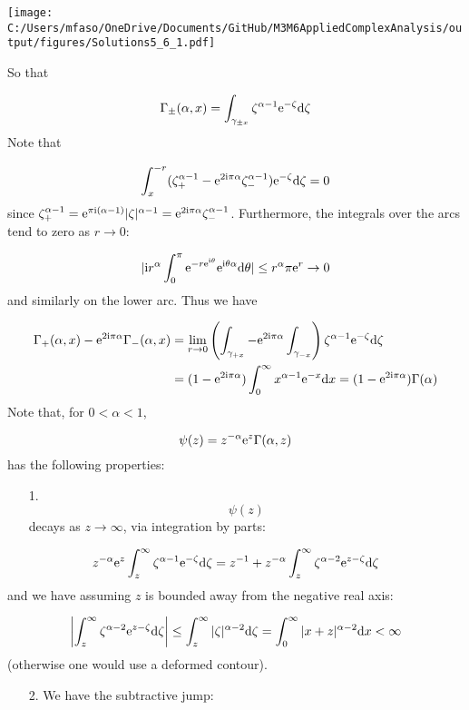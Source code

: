 \documentclass[12pt,landscape]{article}
\def\D{ {\rm d} }
\def\I{ {\rm i} }
\def\E{ {\rm e} }
\def\addtab#1={#1\;&=}
\def\ccr{\\\addtab}
\def\dx{\D x}
\def\addtab#1={#1\;&=}
\def\ccr{\\\addtab}
\begin{document}
{\texttt{[image: C:/Users/mfaso/OneDrive/Documents/GitHub/M3M6AppliedComplexAnalysis/output/figures/Solutions5\_6\_1.pdf]}

So that

\[
\Gamma_\pm(\alpha, x) = \int_{\gamma_{\pm x}} \zeta^{\alpha-1} \E^{-\zeta} \D \zeta
\]
Note that

\[
\int_x^{-r} (\zeta_+^{\alpha - 1} - \E^{2 \I \pi \alpha} \zeta_-^{\alpha -1}) \E^{-\zeta} \D\zeta = 0
\]
since $\zeta_+^{\alpha-1} = \E^{\pi \I (\alpha-1)}|\zeta|^{\alpha-1} = \E^{2 \I \pi \alpha} \zeta_-^{\alpha-1}$. Furthermore, the integrals over the arcs tend to zero as $r \rightarrow 0$:

\[
|\I r^\alpha \int_0^\pi \E^{- r \E^{\I \theta}} \E^{\I \theta \alpha} \D \theta  | \leq r^\alpha \pi \E^r  \rightarrow 0
\]
and similarly on the lower arc. Thus we have


\begin{align*}
\Gamma_+(\alpha, x)-\E^{2 \I \pi \alpha} \Gamma_-(\alpha, x) &= \lim_{r \rightarrow 0 } \left(\int_{\gamma_{+x}} - \E^{2 \I \pi \alpha} \int_{\gamma_{-x}}\right) \zeta^{\alpha-1} \E^{-\zeta} \D \zeta \ccr
 = (1 - \E^{2 \I \pi \alpha})\int_0^\infty x^{\alpha-1} \E^{-x} \dx = (1 - \E^{2 \I \pi \alpha})\Gamma(\alpha)
\end{align*}
Note that, for $0 < \alpha < 1$,

\[
    \psi(z) = z^{-\alpha} \E^z \Gamma(\alpha, z)
\]
has the following properties:

\begin{itemize}
\item[1. ] \[
\psi(z)
\]
decays as $z \rightarrow \infty$, via integration by parts:

\end{itemize}
\[
    z^{-\alpha} \E^z \int_z^\infty \zeta^{\alpha-1} \E^{-\zeta} \D \zeta =
    z^{-1}  + z^{-\alpha} \int_z^\infty \zeta^{\alpha-2} \E^{z-\zeta} \D \zeta
\]
and we have assuming $z$ is bounded away from the negative real axis:

\[
\left\vert\int_z^\infty \zeta^{\alpha-2} \E^{z-\zeta} \D \zeta\right\vert \leq \int_z^\infty |\zeta|^{\alpha-2} \D \zeta = \int_0^\infty |x+z|^{\alpha-2} \D x  < \infty
\]
(otherwise one would use a deformed contour).

\begin{itemize}
\item[2. ] We have the subtractive jump:

\end{itemize}

}
\end{document}
